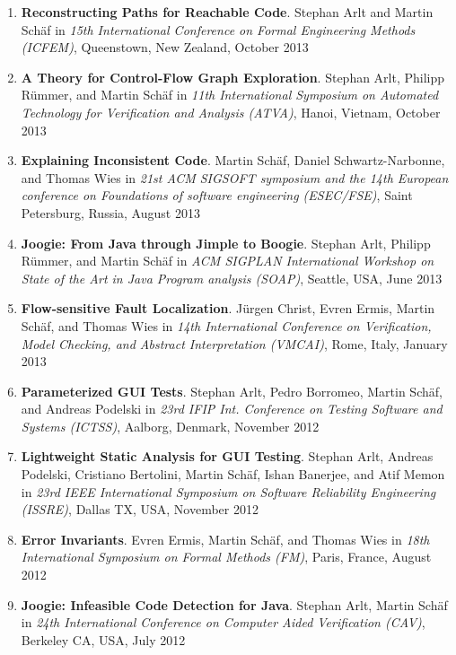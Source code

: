 \begin{enumerate}
\item \textbf{Reconstructing Paths for Reachable Code}.
Stephan Arlt and  Martin Sch\"af in \emph{15th International Conference on
Formal Engineering Methods (ICFEM)}, Queenstown, New Zealand, October 2013


\item \textbf{A Theory for Control-Flow Graph Exploration}.
Stephan Arlt, Philipp R\"ummer, and  Martin Sch\"af in \emph{11th International
Symposium on Automated Technology for Verification and Analysis (ATVA)},
Hanoi, Vietnam, October 2013

\item \textbf{Explaining Inconsistent Code}.  
Martin Sch\"af, Daniel Schwartz-Narbonne, and Thomas Wies in \emph{21st ACM
SIGSOFT symposium and the 14th European conference on Foundations of software
engineering (ESEC/FSE)}, Saint Petersburg, Russia, August 2013


\item \textbf{Joogie: From Java through Jimple to Boogie}. Stephan
Arlt, Philipp R\"ummer, and  Martin Sch\"af  in \emph{ ACM SIGPLAN International Workshop 
on State of the Art in Java Program analysis (SOAP)}, Seattle, USA, June 2013


\item \textbf{Flow-sensitive Fault Localization}.  J\"urgen Christ, Evren Ermis, Martin Sch\"af, 
and Thomas Wies in \emph{14th International Conference on Verification, Model Checking, and 
Abstract Interpretation (VMCAI)}, Rome, Italy, January 2013

\item \textbf{Parameterized GUI Tests}. Stephan
Arlt, Pedro Borromeo,  Martin Sch\"af, and Andreas Podelski  in \emph{ 23rd
IFIP Int. Conference on Testing Software and Systems (ICTSS)}, Aalborg, Denmark,
November 2012

  
\item \textbf{Lightweight Static Analysis for GUI Testing}. Stephan
Arlt, Andreas Podelski, Cristiano Bertolini, Martin Sch\"af, Ishan Banerjee, and
Atif Memon in \emph{ 23rd IEEE International Symposium on Software Reliability
Engineering (ISSRE)}, Dallas TX, USA, November 2012


\item \textbf{Error Invariants}. Evren Ermis, Martin Sch\"af, and Thomas Wies in
\emph{18th International Symposium on Formal Methods (FM)}, Paris, France,
August 2012

\item \textbf{Joogie: Infeasible Code Detection for Java}. Stephan Arlt, Martin
Sch\"af in \emph{24th International Conference on Computer Aided Verification
(CAV)}, Berkeley CA, USA, July 2012


\end{enumerate}
